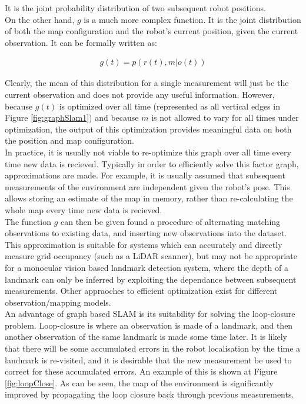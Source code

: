 \documentclass[capstone_report.tex]{subfiles}
\begin{document}
It is the joint probability distribution of two subsequent robot positions.\\

On the other hand, $g$ is a much more complex function. It is the joint distribution of both the map configuration and the robot's current position, given the current observation. It can be formally written as: 

\begin{align*}
  g(t) = p(r(t),m | o(t))
\end{align*}

Clearly, the mean of this distribution for a single measurement will just be the current observation and does not provide any useful information. However, because $g(t)$ is optimized over all time (represented as all vertical edges in Figure \ref{fig:graphSlam1}) and because $m$ is not allowed to vary for all times under optimization, the output of this optimization provides meaningful data on both the position and map configuration.\\

In practice, it is usually not viable to re-optimize this graph over all time every time new data is recieved. Typically in order to efficiently solve this factor graph, approximations are made. For example, it is usually assumed that subsequent measurements of the environment are independent given the robot's pose. This allows storing an estimate of the map in memory, rather than re-calculating the whole map every time new data is recieved.\\

The function $g$ can then be given found a procedure of alternating matching observations to existing data, and inserting new observations into the dataset. This approximation is suitable for systems which can accurately and directly measure grid occupancy (such as a LiDAR scanner), but may not be appropriate for a monocular vision based landmark detection system, where the depth of a landmark can only be inferred by exploiting the dependance between subsequent measurements. Other appraoches to efficient optimization exist for different observation/mapping models.\\

An advantage of graph based SLAM is its suitability for solving the loop-closure problem. Loop-closure is where an observation is made of a landmark, and then another observation of the same landmark is made some time later. It is likely that there will be some accumulated errors in the robot localisation by the time a landmark is re-visited, and it is desirable that the new measurement be used to correct for these accumulated errors. An example of this is shown at Figure \ref{fig:loopClose}. As can be seen, the map of the environment is significantly improved by propagating the loop closure back through previous measurements.
\end{document}
